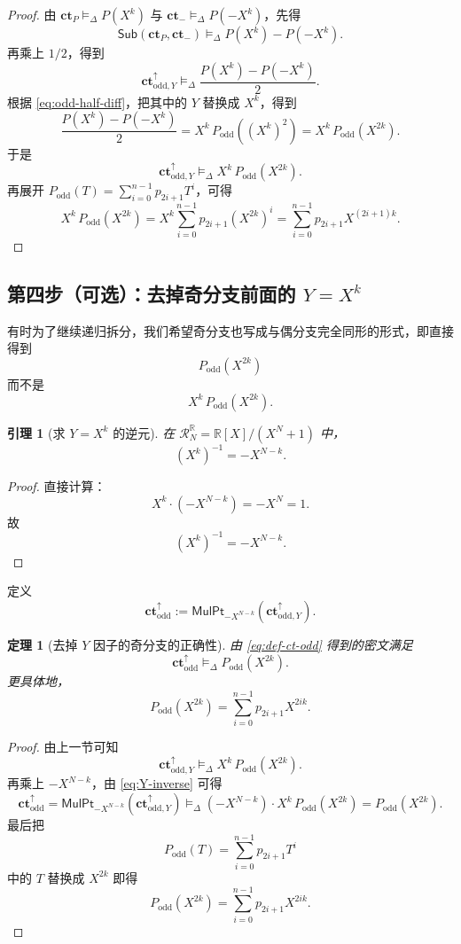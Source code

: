 \documentclass[11pt,a4paper]{ctexart}
\newcommand{\RR}{\mathbb{R}}
\newcommand{\Sub}{\mathsf{Sub}}
\newcommand{\MulPt}[1]{\mathsf{MulPt}_{#1}}
\newcommand{\ct}{\mathbf{ct}}
\newcommand{\ctoy}{\mathbf{ct}_{\mathrm{odd},Y}^{\uparrow}}
\newcommand{\cto}{\mathbf{ct}_{\mathrm{odd}}^{\uparrow}}
\newcommand{\Rbig}{\mathcal{R}_N^{\RR}}
\newcommand{\rep}{\mathrel{\vDash_{\Delta}}}
\newtheorem{theorem}[definition]{定理}
\newtheorem{lemma}[definition]{引理}
\begin{document}
\begin{proof}
由 \(\ct_P\rep P(X^k)\) 与 \(\ct_{-}\rep P(-X^k)\)，先得
\[
\Sub(\ct_P,\ct_{-})\rep P(X^k)-P(-X^k).
\]
再乘上 \(1/2\)，得到
\[
\ctoy \rep \frac{P(X^k)-P(-X^k)}{2}.
\]
根据 \eqref{eq:odd-half-diff}，把其中的 \(Y\) 替换成 \(X^k\)，得到
\[
\frac{P(X^k)-P(-X^k)}{2}
=
X^k\,P_{\mathrm{odd}}((X^k)^2)
=
X^k\,P_{\mathrm{odd}}(X^{2k}).
\]
于是
\[
\ctoy \rep X^k\,P_{\mathrm{odd}}(X^{2k}).
\]
再展开 \(P_{\mathrm{odd}}(T)=\sum_{i=0}^{n-1}p_{2i+1}T^i\)，可得
\[
X^k\,P_{\mathrm{odd}}(X^{2k})
=
X^k\sum_{i=0}^{n-1}p_{2i+1}(X^{2k})^i
=
\sum_{i=0}^{n-1}p_{2i+1}X^{(2i+1)k}.
\]
\end{proof}

\subsection{第四步（可选）：去掉奇分支前面的 \texorpdfstring{\(Y=X^k\)}{Y=Xk}}

有时为了继续递归拆分，我们希望奇分支也写成与偶分支完全同形的形式，即直接得到
\[
P_{\mathrm{odd}}(X^{2k})
\]
而不是
\[
X^k\,P_{\mathrm{odd}}(X^{2k}).
\]

\begin{lemma}[求 \(Y=X^k\) 的逆元]
在 \(\Rbig=\RR[X]/(X^N+1)\) 中，
\begin{equation}
(X^k)^{-1}=-X^{N-k}. \label{eq:Y-inverse}
\end{equation}
\end{lemma}

\begin{proof}
直接计算：
\[
X^k\cdot(-X^{N-k})=-X^N=1.
\]
故
\[
(X^k)^{-1}=-X^{N-k}.
\]
\end{proof}

定义
\begin{equation}
\cto
:=
\MulPt{-X^{N-k}}(\ctoy). \label{eq:def-ct-odd}
\end{equation}

\begin{theorem}[去掉 \(Y\) 因子的奇分支的正确性]
由 \eqref{eq:def-ct-odd} 得到的密文满足
\[
\cto \rep P_{\mathrm{odd}}(X^{2k}).
\]
更具体地，
\[
P_{\mathrm{odd}}(X^{2k})=\sum_{i=0}^{n-1}p_{2i+1}X^{2ik}.
\]
\end{theorem}

\begin{proof}
由上一节可知
\[
\ctoy \rep X^k\,P_{\mathrm{odd}}(X^{2k}).
\]
再乘上 \(-X^{N-k}\)，由 \eqref{eq:Y-inverse} 可得
\[
\cto
=
\MulPt{-X^{N-k}}(\ctoy)
\rep
(-X^{N-k})\cdot X^k\,P_{\mathrm{odd}}(X^{2k})
=
P_{\mathrm{odd}}(X^{2k}).
\]
最后把
\[
P_{\mathrm{odd}}(T)=\sum_{i=0}^{n-1}p_{2i+1}T^i
\]
中的 \(T\) 替换成 \(X^{2k}\) 即得
\[
P_{\mathrm{odd}}(X^{2k})=\sum_{i=0}^{n-1}p_{2i+1}X^{2ik}.
\]
\end{proof}
\end{document}
